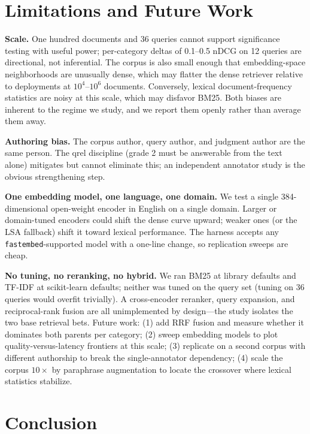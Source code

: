\documentclass[11pt,a4paper]{article}
\newcommand{\pkg}[1]{\texttt{#1}}
\begin{document}
\section{Limitations and Future Work}\label{sec:limits}

\textbf{Scale.} One hundred documents and 36 queries cannot support significance testing with useful power; per-category deltas of 0.1--0.5 nDCG on 12 queries are directional, not inferential. The corpus is also small enough that embedding-space neighborhoods are unusually dense, which may flatter the dense retriever relative to deployments at $10^4$--$10^6$ documents. Conversely, lexical document-frequency statistics are noisy at this scale, which may disfavor BM25. Both biases are inherent to the regime we study, and we report them openly rather than average them away.

\textbf{Authoring bias.} The corpus author, query author, and judgment author are the same person. The qrel discipline (grade 2 must be answerable from the text alone) mitigates but cannot eliminate this; an independent annotator study is the obvious strengthening step.

\textbf{One embedding model, one language, one domain.} We test a single 384-dimensional open-weight encoder in English on a single domain. Larger or domain-tuned encoders could shift the dense curve upward; weaker ones (or the LSA fallback) shift it toward lexical performance. The harness accepts any \pkg{fastembed}-supported model with a one-line change, so replication sweeps are cheap.

\textbf{No tuning, no reranking, no hybrid.} We ran BM25 at library defaults and TF-IDF at scikit-learn defaults; neither was tuned on the query set (tuning on 36 queries would overfit trivially). A cross-encoder reranker, query expansion, and reciprocal-rank fusion are all unimplemented by design---the study isolates the two base retrieval bets. Future work: (1) add RRF fusion and measure whether it dominates both parents per category; (2) sweep embedding models to plot quality-versus-latency frontiers at this scale; (3) replicate on a second corpus with different authorship to break the single-annotator dependency; (4) scale the corpus $10\times$ by paraphrase augmentation to locate the crossover where lexical statistics stabilize.

\section{Conclusion}\label{sec:conclusion}
\end{document}
